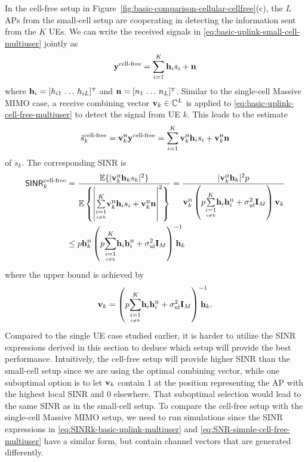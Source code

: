 In the cell-free setup in Figure~\ref{fig:basic-comparison-cellular-cellfree}(c), the $L$ \glspl{AP} from the small-cell setup are cooperating in detecting the information sent from the $K$ \glspl{UE}. We can write the received signals in \eqref{eq:basic-uplink-small-cell-multiuser} jointly as
\begin{equation} \label{eq:basic-uplink-cell-free-multiuser}
\mathbf{y}^{\textrm{cell-free}} = \sum_{i=1}^{K} \mathbf{h}_i s_i + \mathbf{n}
\end{equation}
where $\vect{h}_i = [ h_{i1} \, \ldots \, h_{iL} ]^{\Ttran}$ and $\vect{n} = [ n_1 \, \ldots \, n_L ]^{\Ttran}$.
Similar to the single-cell Massive \gls{MIMO} case, a receive combining vector $\mathbf{v} _k \in \mathbb{C}^L$ is applied to \eqref{eq:basic-uplink-cell-free-multiuser} to detect the signal from \gls{UE} $k$. This leads to the estimate
\begin{equation} \label{eq:s-estimate-cellfree-multiuser}
\hat{s}_k^{\textrm{cell-free}}  = \vect{v}_k^{\Htran} \vect{y}^{\textrm{cell-free}}  =   \sum_{i=1}^{K} \vect{v}_k^{\Htran} \vect{h}_i s_i + \vect{v}_k^{\Htran}\vect{n}
\end{equation}
of $s_k$. The corresponding \gls{SINR} is
\begin{align} \notag
\mathacr{SINR}_k^{\textrm{cell-free}} &= \frac{\mathbb{E}\{ | \vect{v}_k^{\Htran} \vect{h}_k s_k  |^2 \}}{ \mathbb{E} \left\{ \left|
\condSum{i=1}{i \neq k}{K} \vect{v}_k^{\Htran} \vect{h}_i s_i + \vect{v}_k^{\Htran}\vect{n}
\right|^2 \right\} } = \frac{| \vect{v}_k^{\Htran} \vect{h}_k|^2 p }{\vect{v}_k^{\Htran} \left( p  \condSum{i=1}{i \neq k}{K} \vect{h}_i \vect{h}_i^{\Htran} + \sigmaUL \vect{I}_M  \right) \vect{v}_k} \\
&\leq p \vect{h}_k^{\Htran} \left( p  \condSum{i=1}{i \neq k}{K} \vect{h}_i \vect{h}_i^{\Htran} + \sigmaUL \vect{I}_M  \right)^{-1} \!\!\!\!\!\!\vect{h}_k \label{eq:SNR-simple-cell-free-multiuser}
\end{align}
where the upper bound is achieved by \cite[Lemma B.10]{massivemimobook}
\begin{align}
\vect{v}_k = \left( p  \condSum{i=1}{i \neq k}{K} \vect{h}_i \vect{h}_i^{\Htran} + \sigmaUL \vect{I}_M  \right)^{-1} \!\!\!\!\!\!\vect{h}_k.
\end{align} 
Compared to the single \gls{UE} case studied earlier, it is harder to utilize the \gls{SINR} expressions derived in this section to deduce which setup will provide the best performance. Intuitively, the cell-free setup will provide higher \gls{SINR} than the small-cell setup since we are using the optimal combining vector, while one suboptimal option is to let $\mathbf{v}_k$ contain $1$ at the position representing the \gls{AP} with the highest local \gls{SINR} and $0$ elsewhere. That suboptimal selection would lead to the same SINR as in the small-cell setup. To compare the cell-free setup with the single-cell Massive \gls{MIMO} setup, we need to run simulations since the \gls{SINR} expressions in \eqref{eq:SINRk-basic-uplink-multiuser} and \eqref{eq:SNR-simple-cell-free-multiuser} have a similar form, but contain channel vectors that are generated differently.


